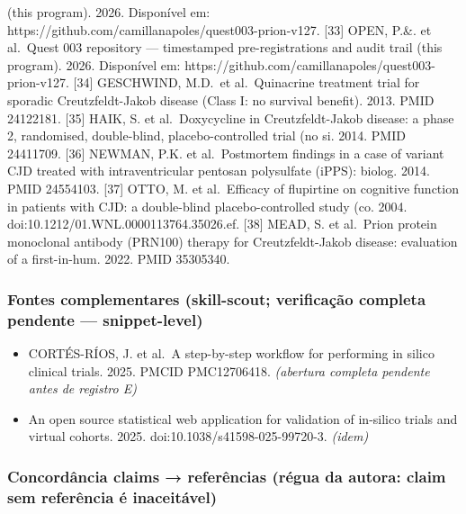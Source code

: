 \documentclass[
  10pt,
]{article}
\providecommand{\tightlist}{%
  \setlength{\itemsep}{0pt}\setlength{\parskip}{0pt}}
\begin{document}
(this program). 2026. Disponível em:
https://github.com/camillanapoles/quest003-prion-v127. {[}33{]} OPEN,
P.\&. et al.~Quest 003 repository --- timestamped pre-registrations and
audit trail (this program). 2026. Disponível em:
https://github.com/camillanapoles/quest003-prion-v127. {[}34{]}
GESCHWIND, M.D.~et al.~Quinacrine treatment trial for sporadic
Creutzfeldt-Jakob disease (Class I: no survival benefit). 2013. PMID
24122181. {[}35{]} HAIK, S. et al.~Doxycycline in Creutzfeldt-Jakob
disease: a phase 2, randomised, double-blind, placebo-controlled trial
(no si. 2014. PMID 24411709. {[}36{]} NEWMAN, P.K. et al.~Postmortem
findings in a case of variant CJD treated with intraventricular pentosan
polysulfate (iPPS): biolog. 2014. PMID 24554103. {[}37{]} OTTO, M. et
al.~Efficacy of flupirtine on cognitive function in patients with CJD: a
double-blind placebo-controlled study (co. 2004.
doi:10.1212/01.WNL.0000113764.35026.ef. {[}38{]} MEAD, S. et al.~Prion
protein monoclonal antibody (PRN100) therapy for Creutzfeldt-Jakob
disease: evaluation of a first-in-hum. 2022. PMID 35305340.

\hypertarget{fontes-complementares-skill-scout-verificauxe7uxe3o-completa-pendente-snippet-level}{%
\subsubsection{Fontes complementares (skill-scout; verificação completa
pendente ---
snippet-level)}\label{fontes-complementares-skill-scout-verificauxe7uxe3o-completa-pendente-snippet-level}}

\begin{itemize}
\tightlist
\item
  CORTÉS-RÍOS, J. et al.~A step-by-step workflow for performing in
  silico clinical trials. 2025. PMCID PMC12706418. \emph{(abertura
  completa pendente antes de registro E)}
\item
  An open source statistical web application for validation of in-silico
  trials and virtual cohorts. 2025. doi:10.1038/s41598-025-99720-3.
  \emph{(idem)}
\end{itemize}

\hypertarget{concorduxe2ncia-claims-referuxeancias-ruxe9gua-da-autora-claim-sem-referuxeancia-uxe9-inaceituxe1vel}{%
\subsubsection{Concordância claims → referências (régua da autora: claim
sem referência é
inaceitável)}\label{concorduxe2ncia-claims-referuxeancias-ruxe9gua-da-autora-claim-sem-referuxeancia-uxe9-inaceituxe1vel}}
\end{document}
